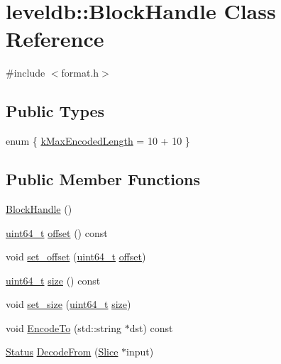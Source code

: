 \hypertarget{classleveldb_1_1_block_handle}{}\section{leveldb\+:\+:Block\+Handle Class Reference}
\label{classleveldb_1_1_block_handle}


{\ttfamily \#include $<$format.\+h$>$}

\subsection*{Public Types}
\begin{DoxyCompactItemize}
\item 
enum \{ \hyperlink{classleveldb_1_1_block_handle_a4153eecd289cbd4c8beb9a8bdd90aa82aa75d972eb34f4e3618f95d045539dd09}{k\+Max\+Encoded\+Length} = 10 + 10
 \}
\end{DoxyCompactItemize}
\subsection*{Public Member Functions}
\begin{DoxyCompactItemize}
\item 
\hyperlink{classleveldb_1_1_block_handle_af2764f113b34af923ba196eb94cb2d09}{Block\+Handle} ()
\item 
\hyperlink{stdint_8h_aaa5d1cd013383c889537491c3cfd9aad}{uint64\+\_\+t} \hyperlink{classleveldb_1_1_block_handle_a31071c24f77e52a3bfc3a228f9f6c133}{offset} () const 
\item 
void \hyperlink{classleveldb_1_1_block_handle_ae6dad857a4f7f5e051762f874f0050bc}{set\+\_\+offset} (\hyperlink{stdint_8h_aaa5d1cd013383c889537491c3cfd9aad}{uint64\+\_\+t} \hyperlink{classleveldb_1_1_block_handle_a31071c24f77e52a3bfc3a228f9f6c133}{offset})
\item 
\hyperlink{stdint_8h_aaa5d1cd013383c889537491c3cfd9aad}{uint64\+\_\+t} \hyperlink{classleveldb_1_1_block_handle_a44931c9086cb3c30f767c751c3a7daec}{size} () const 
\item 
void \hyperlink{classleveldb_1_1_block_handle_a47a4169dce3026122b76d594453b78a8}{set\+\_\+size} (\hyperlink{stdint_8h_aaa5d1cd013383c889537491c3cfd9aad}{uint64\+\_\+t} \hyperlink{classleveldb_1_1_block_handle_a44931c9086cb3c30f767c751c3a7daec}{size})
\item 
void \hyperlink{classleveldb_1_1_block_handle_a71aa041d686d43e66ab570fce1ac388e}{Encode\+To} (std\+::string $\ast$dst) const 
\item 
\hyperlink{classleveldb_1_1_status}{Status} \hyperlink{classleveldb_1_1_block_handle_a1660fd202984d8d5bfa4bed6c5613621}{Decode\+From} (\hyperlink{classleveldb_1_1_slice}{Slice} $\ast$input)
\end{DoxyCompactItemize}


